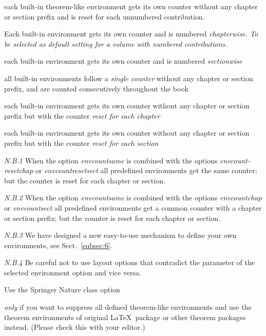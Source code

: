 \documentclass[graybox]{svmult}
\begin{document}
\begin{refguide}
\begin{sloppy}
\begin{description}
\item[\textit{default}] each built-in theorem-like environment gets its own
counter without any chapter or section prefix and is
reset for each unnumbered contribution.
\item[\textit{envcountchap}] Each built-in environment gets its own counter and
is numbered \textit{chapterwise}. \textit{To be selected as default
setting for a volume with numbered contributions}.
\item[\textit{envcountsect}] each built-in environment gets its own counter and
is numbered \textit{sectionwise}
\item[\textit{envcountsame}] all built-in environments follow a \textit{single counter}
without any chapter or section prefix, and are
counted consecutively throughout the book
\item[\textit{envcountresetchap}] each built-in environment gets its own counter without any chapter or section prefix but with the counter
\textit{reset for each chapter}
\item[\textit{envcountresetsect}] each built-in environment gets its own counter without any chapter or section prefix but with the counter
\textit{reset for each section}
\end{description}


\textit{N.B.1} When the option \textit{envcountsame} is combined with the options \textit{envcount-resetchap} or \textit{envcountresetsect} all predefined environments get the same
counter; but the counter is reset for each chapter or section.


\textit{N.B.2} When the option \textit{envcountsame} is combined with the options \textit{envcountchap}
or \textit{envcountsect} all predefined environments get a common counter with
a chapter or section prefix; but the counter is reset for each chapter or section.


\textit{N.B.3} We have designed a new easy-to-use mechanism to define your own environments, see Sect.~\ref{subsec:6}.


\textit{N.B.4} Be careful not to use layout options that contradict the parameter of the
selected environment option and vice versa. 


Use the Springer Nature class option

\begin{description}
\item[\textit{nospthms}] \textit{only} if you want to suppress all defined theorem-like
environments and use the theorem environments of original \LaTeX\ package or other theorem packages instead.
(Please check this with your editor.)
\end{description}



\end{sloppy}
\end{refguide}
\end{document}
